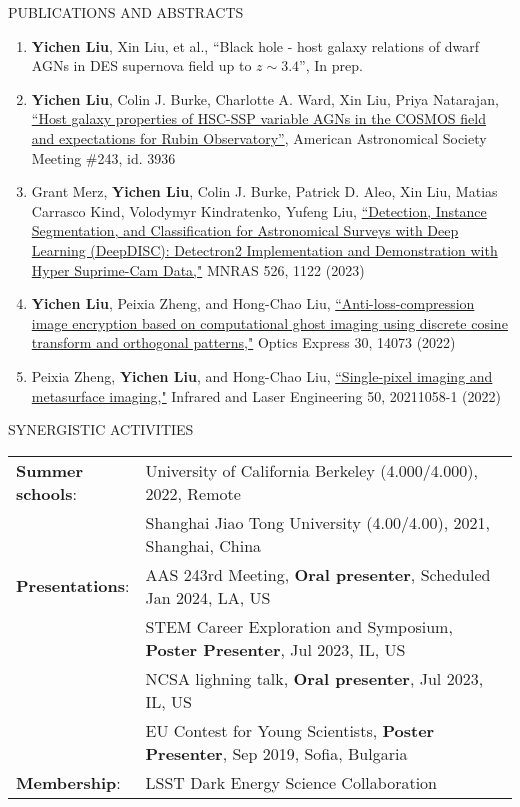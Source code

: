 \documentclass[10pt]{article} %
\begin{document}
\begin{section}{PUBLICATIONS AND ABSTRACTS}
    
\begin{enumerate}[leftmargin=1.5em]
    \item \textbf{Yichen Liu}, Xin Liu, et al., ``Black hole - host galaxy relations of dwarf AGNs in DES supernova field up to $z\sim3.4$'', In prep.
    \item \textbf{Yichen Liu}, Colin J. Burke, Charlotte A. Ward, Xin Liu, Priya Natarajan, \href{https://submissions.mirasmart.com/AAS243/Itinerary/PresentationDetail.aspx?evdid=500}{``Host galaxy properties of HSC-SSP variable AGNs in the COSMOS field and expectations for Rubin Observatory''}, American Astronomical Society Meeting \#243, id. 3936
    \item Grant Merz, \textbf{Yichen Liu}, Colin J. Burke, Patrick D. Aleo, Xin Liu, Matias Carrasco Kind, Volodymyr Kindratenko, Yufeng Liu, \href{https://academic.oup.com/mnras/advance-article-abstract/doi/10.1093/mnras/stad2785/7273850?redirectedFrom=fulltext}{``Detection, Instance Segmentation, and Classification for Astronomical Surveys with Deep Learning (DeepDISC): Detectron2 Implementation and Demonstration with Hyper Suprime-Cam Data,"} MNRAS 526, 1122 (2023)
    \item \textbf{Yichen Liu}, Peixia Zheng, and Hong-Chao Liu, \href{https://opg.optica.org/oe/fulltext.cfm?uri=oe-30-9-14073&id=471300}{``Anti-loss-compression image encryption based on computational ghost imaging using discrete cosine transform and orthogonal patterns,"} Optics Express 30, 14073 (2022)
    \item Peixia Zheng, \textbf{Yichen Liu}, and Hong-Chao Liu, \href{http://www.irla.cn/cn/article/doi/10.3788/IRLA20211058}{``Single-pixel imaging and metasurface imaging,"} Infrared and Laser Engineering 50, 20211058-1 (2022)
\end{enumerate}

\end{section}

\begin{section}{SYNERGISTIC ACTIVITIES}

\begin{tabular}{@{}p{0.2\linewidth}@{}p{0.8\linewidth}@{}}
    \textbf{Summer schools}: & University of California Berkeley (4.000/4.000), 2022, Remote \\
    & Shanghai Jiao Tong University (4.00/4.00), 2021, Shanghai, China \\
    \textbf{Presentations}: & AAS 243rd Meeting, \textbf{Oral presenter}, Scheduled Jan 2024, LA, US \\
    & STEM Career Exploration and Symposium, \textbf{Poster Presenter}, Jul 2023, IL, US \\
    & NCSA lighning talk, \textbf{Oral presenter}, Jul 2023, IL, US \\
    & EU Contest for Young Scientists, \textbf{Poster Presenter}, Sep 2019, Sofia, Bulgaria \\
    \textbf{Membership}: &LSST Dark Energy Science Collaboration \\
\end{tabular}

\end{section}
\end{document}
